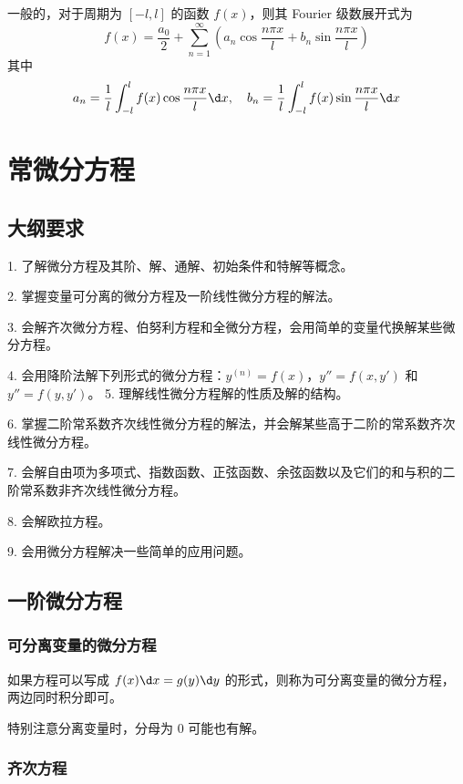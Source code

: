 一般的，对于周期为 $[-l,l]$ 的函数 $f(x)$，则其 Fourier 级数展开式为
\[ f(x) = \frac{a_0}{2} + \sum_{n=1}^{\infty} \left( a_n \cos \frac{n \pi x}{l} + b_n \sin \frac{n \pi x}{l} \right) \]
其中
\[ a_n = \frac{1}{l} \int_{-l}^{l} f(x) \cos \frac{n \pi x}{l} \d x, \quad b_n = \frac{1}{l} \int_{-l}^{l} f(x) \sin \frac{n \pi x}{l} \d x  \]


\section{常微分方程}

\subsection{大纲要求}

1. 了解微分方程及其阶、解、通解、初始条件和特解等概念。

2. 掌握变量可分离的微分方程及一阶线性微分方程的解法。

3. 会解齐次微分方程、伯努利方程和全微分方程，会用简单的变量代换解某些微分方程。

4. 会用降阶法解下列形式的微分方程：$y^{(n)} = f(x)$，$y''= f(x,y')$ 和 $y''= f(y,y')$。
5. 理解线性微分方程解的性质及解的结构。

6. 掌握二阶常系数齐次线性微分方程的解法，并会解某些高于二阶的常系数齐次线性微分方程。

7. 会解自由项为多项式、指数函数、正弦函数、余弦函数以及它们的和与积的二阶常系数非齐次线性微分方程。

8. 会解欧拉方程。

9. 会用微分方程解决一些简单的应用问题。

\subsection{一阶微分方程}

\subsubsection*{可分离变量的微分方程}

如果方程可以写成 $f(x) \d x = g(y) \d y$ 的形式，则称为可分离变量的微分方程，两边同时积分即可。

\begin{note}
	特别注意分离变量时，分母为 $0$ 可能也有解。
\end{note}

\subsubsection*{齐次方程}

